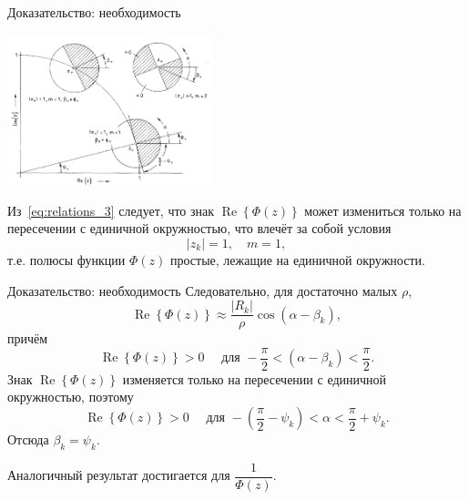 \documentclass[notheorems,aspectratio=169]{beamer}
\theoremstyle{definition}
\newcommand{\abs}[1]{\left| #1 \right|}
\newcommand{\paren}[1]{\left(#1\right)}
\renewcommand{\Re}{\operatorname{Re}}
\begin{document}
\begin{frame}{Доказательство: необходимость}
  \begin{center}
    \includegraphics[width=6cm]{Poles}
  \end{center}

  Из~\eqref{eq:relations_3} следует, что знак $\Re \left\{ \Phi(z) \right\}$
  может измениться только на пересечении с единичной окружностью, что влечёт за собой
  условия
  \begin{equation}
    \abs{z_k} = 1, \quad m = 1,
  \end{equation}
  т.е. полюсы функции $\Phi(z)$ простые, лежащие на единичной окружности.
\end{frame}

\begin{frame}{Доказательство: необходимость}
  Следовательно, для достаточно малых $\rho$,
  \begin{equation*}
    \Re \left\{\Phi(z)\right\} \approx \frac{\abs{R_{k}}}{\rho} \cos\paren{\alpha - \beta_k},
  \end{equation*}
  причём
  \begin{equation*}
    \Re \left\{ \Phi(z) \right\} > 0 \quad \mbox{ для } -\frac{\pi}{2} < \paren{\alpha - \beta_k} < \frac{\pi}{2}.
  \end{equation*}
  Знак $\Re \left\{ \Phi(z) \right\}$ изменяется только на пересечении с единичной окружностью, поэтому
  \begin{equation*}
    \Re \left\{ \Phi(z) \right\} > 0 \quad \mbox{ для } -\paren{\frac{\pi}{2} - \psi_k} < \alpha < \frac{\pi}{2} + \psi_k.
  \end{equation*}
  Отсюда $\beta_k = \psi_k$.

  Аналогичный результат достигается для $\dfrac{1}{\Phi(z)}$.
\end{frame}
\end{document}
